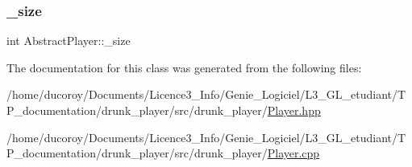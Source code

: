 \subsubsection{\texorpdfstring{\+\_\+size}{\_size}}
{\footnotesize\ttfamily int Abstract\+Player\+::\+\_\+size\hspace{0.3cm}{\ttfamily [protected]}}



The documentation for this class was generated from the following files\+:\begin{DoxyCompactItemize}
\item 
/home/ducoroy/\+Documents/\+Licence3\+\_\+\+Info/\+Genie\+\_\+\+Logiciel/\+L3\+\_\+\+G\+L\+\_\+etudiant/\+T\+P\+\_\+documentation/drunk\+\_\+player/src/drunk\+\_\+player/\hyperlink{Player_8hpp}{Player.\+hpp}\item 
/home/ducoroy/\+Documents/\+Licence3\+\_\+\+Info/\+Genie\+\_\+\+Logiciel/\+L3\+\_\+\+G\+L\+\_\+etudiant/\+T\+P\+\_\+documentation/drunk\+\_\+player/src/drunk\+\_\+player/\hyperlink{Player_8cpp}{Player.\+cpp}\end{DoxyCompactItemize}
